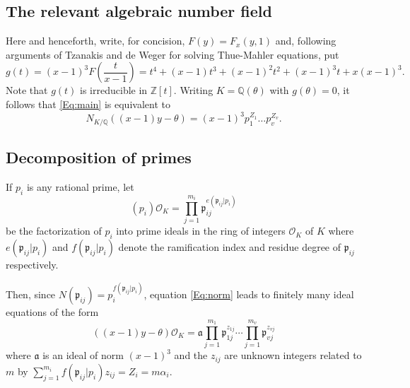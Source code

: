 {%
\subsection{The relevant algebraic number field}

Here and henceforth, write, for concision, $F(y)=F_x(y,1)$ and, following arguments of Tzanakis and de Weger 
\cite{TW3} for solving  Thue-Mahler equations, put
$$
g(t) = (x-1)^3F\left(\frac{t}{x-1}\right) = t^4 + (x-1)t^3 + (x-1)^2t^2 + (x-1)^3t + x(x-1)^3.
$$
Note that $g(t)$ is irreducible in $\mathbb{Z}[t]$. Writing $K = \mathbb{Q}(\theta)$ with $g(\theta) = 0$, it follows that
 \eqref{Eq:main} is equivalent to
\begin{equation} \label{Eq:norm}
N_{K/\mathbb{Q}}((x-1)y-\theta) =  (x-1)^{3}p_1^{Z_1}\dots p_v^{Z_v}.
\end{equation}

\subsection{Decomposition of primes}

If $p_i$ is any rational prime, let 
\[(p_i)\mathcal{O}_K = \prod_{j = 1}^{m_i} \mathfrak{p}_{ij}^{e(\mathfrak{p}_{ij}|p_i)}\]
be the factorization of $p_i$ into prime ideals in the ring of integers $\mathcal{O}_K$ of $K$ where $e(\mathfrak{p}_{ij}|p_i)$ and $f(\mathfrak{p}_{ij}|p_i)$ denote the ramification index and residue degree of $\mathfrak{p}_{ij}$ respectively.

Then, since $N(\mathfrak{p}_{ij}) = p_i^{f(\mathfrak{p}_{ij}|p_i)}$, equation \eqref{Eq:norm} leads to finitely many ideal equations of the form
\begin{equation} \label{Eq:ideals}
((x-1)y-\theta)\mathcal{O}_K = \mathfrak{a} \prod_{j = 1}^{m_1} \mathfrak{p}_{1j}^{z_{1j}} \cdots \prod_{j = 1}^{m_v} \mathfrak{p}_{vj}^{z_{vj}}
\end{equation}
where $\mathfrak{a}$ is an ideal of norm $(x-1)^3$ and the $z_{ij}$ are unknown integers related to $m$ by $\sum_{j = 1}^{m_i} f(\mathfrak{p}_{ij}|p_i)z_{ij} = Z_i = m \alpha_i$. 

}
